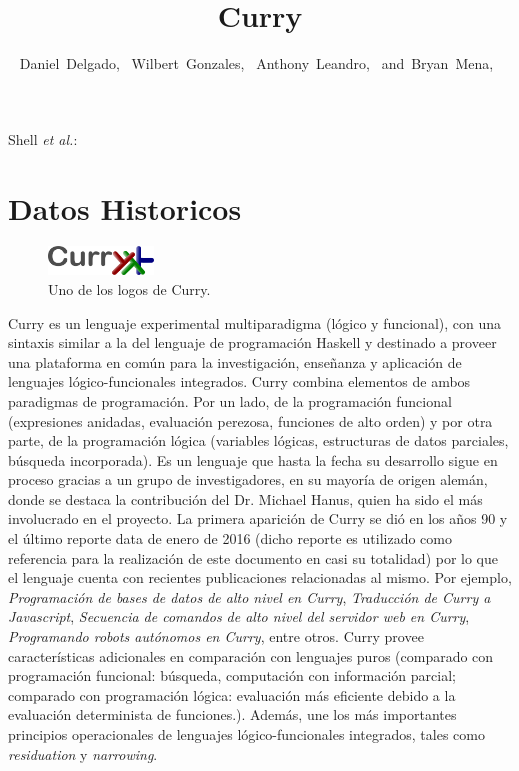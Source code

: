 \documentclass[10pt,journal,compsoc]{IEEEtran}
\begin{document}
\title{Curry}

\author{Daniel~Delgado,~
	Wilbert~Gonzales,~
	Anthony~Leandro,~
	and~Bryan~Mena,~
}
{Shell \MakeLowercase{\textit{et al.}}: \LaTex}


\maketitle

\IEEEdisplaynontitleabstractindextext

\IEEEpeerreviewmaketitle

\section{Datos Historicos}
\begin{figure}
	\centering
	\includegraphics[width=0.25\textwidth]{Curry.png}
	\caption{\label{fig:HaskellCurry}Uno de los logos de Curry.}
\end{figure}
Curry es un lenguaje experimental multiparadigma (l\'ogico y funcional), con una sintaxis similar a la del lenguaje de programaci\'on Haskell y destinado a proveer una plataforma en com\'un para la investigaci\'on, ense\~nanza y aplicaci\'on de lenguajes l\'ogico-funcionales integrados. Curry combina elementos de ambos paradigmas de programaci\'on. Por un lado, de la programaci\'on funcional (expresiones anidadas, evaluaci\'on perezosa, funciones de alto orden) y por otra parte, de la programaci\'on l\'ogica (variables l\'ogicas, estructuras de datos parciales, b\'usqueda incorporada). Es un lenguaje que hasta la fecha su desarrollo sigue en proceso gracias a un grupo de investigadores, en su mayor\'ia de origen alem\'an, donde se destaca la contribuci\'on del Dr. Michael Hanus, quien ha sido el m\'as involucrado en el proyecto. La primera aparici\'on de Curry se di\'o en los a\~nos 90 y el \'ultimo reporte  data de enero de 2016 (dicho reporte es utilizado como referencia para la realizaci\'on de este documento en casi su totalidad) por lo que el lenguaje cuenta con recientes publicaciones relacionadas al mismo.  Por ejemplo, \emph{Programaci\'on de bases de datos de alto nivel en Curry}, \emph{Traducci\'on de Curry a Javascript}, \emph{Secuencia de comandos de alto nivel del servidor web en Curry}, \emph{Programando robots aut\'onomos en Curry}, entre otros. Curry provee caracter\'isticas adicionales en comparaci\'on con lenguajes puros (comparado con programaci\'on funcional: b\'usqueda, computaci\'on con informaci\'on parcial; comparado con programaci\'on l\'ogica: evaluaci\'on m\'as eficiente debido a la evaluaci\'on determinista de funciones.). Adem\'as, une los m\'as importantes principios operacionales de lenguajes l\'ogico-funcionales integrados, tales como \emph{residuation} y \emph {narrowing}.
\end{document}
